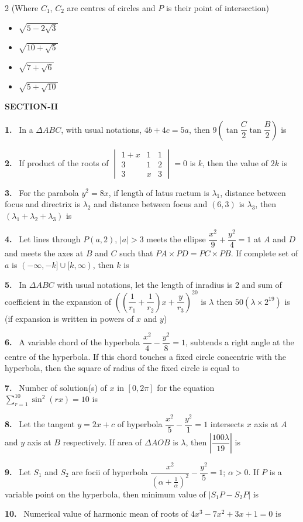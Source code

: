 \documentclass[10pt]{extarticle}
\newcommand{\sect}[1]{\par\smallskip\noindent\textbf{#1}\par}
\newcommand{\qn}[1]{\par\smallskip\noindent\textbf{#1.}~}
\newenvironment{qoptions}{\begin{itemize}[leftmargin=1.8em,itemsep=1pt,topsep=2pt,label={}]}{\end{itemize}}
\newcommand{\opt}[2]{\item[(#1)] #2}
\begin{document}
\begin{multicols}{2}
(Where $C_1$, $C_2$ are centres of circles and $P$ is their point of intersection)
\begin{qoptions}
\opt{A}{$\sqrt{5-2\sqrt3}$}
\opt{B}{$\sqrt{10+\sqrt5}$}
\opt{C}{$\sqrt{7+\sqrt6}$}
\opt{D}{$\sqrt{5+\sqrt{10}}$}
\end{qoptions}
\sect{SECTION-II}
\qn{1} In a $\Delta ABC$, with usual notations, $4b+4c=5a$, then $9\left(\tan\dfrac C2\tan\dfrac B2\right)$ is
\qn{2} If product of the roots of $\begin{vmatrix}1+x&1&1\\3&1&2\\3&x&3\end{vmatrix}=0$ is $k$, then the value of $2k$ is
\qn{3} For the parabola $y^2=8x$, if length of latus ractum is $\lambda_1$, distance between focus and directrix is $\lambda_2$ and distance between focus and $(6,3)$ is $\lambda_3$, then $(\lambda_1+\lambda_2+\lambda_3)$ is
\qn{4} Let lines through $P(a,2)$, $|a|>3$ meets the ellipse $\dfrac{x^2}9+\dfrac{y^2}4=1$ at $A$ and $D$ and meets the axes at $B$ and $C$ such that $PA\times PD=PC\times PB$. If complete set of $a$ is $(-\infty,-k]\cup[k,\infty)$, then $k$ is
\qn{5} In $\Delta ABC$ with usual notations, let the length of inradius is 2 and sum of coefficient in the expansion of $\left(\left(\dfrac1{r_1}+\dfrac1{r_2}\right)x+\dfrac y{r_3}\right)^{20}$ is $\lambda$ then $50(\lambda\times2^{19})$ is (if expansion is written in powers of $x$ and $y$)
\qn{6} A variable chord of the hyperbola $\dfrac{x^2}4-\dfrac{y^2}8=1$, subtends a right angle at the centre of the hyperbola. If this chord touches a fixed circle concentric with the hyperbola, then the square of radius of the fixed circle is equal to \underline{\hspace{1cm}}
\qn{7} Number of solution(s) of $x$ in $[0,2\pi]$ for the equation $\displaystyle\sum_{r=1}^{10}\sin^2(rx)=10$ is
\qn{8} Let the tangent $y=2x+c$ of hyperbola $\dfrac{x^2}5-\dfrac{y^2}1=1$ intersects $x$ axis at $A$ and $y$ axis at $B$ respectively. If area of $\Delta AOB$ is $\lambda$, then $\left|\dfrac{100\lambda}{19}\right|$ is
\qn{9} Let $S_1$ and $S_2$ are focii of hyperbola $\dfrac{x^2}{\left(\alpha+\frac1\alpha\right)^2}-\dfrac{y^2}5=1$; $\alpha>0$. If $P$ is a variable point on the hyperbola, then minimum value of $|S_1P-S_2P|$ is
\qn{10} Numerical value of harmonic mean of roots of $4x^3-7x^2+3x+1=0$ is
\end{multicols}
\end{document}
